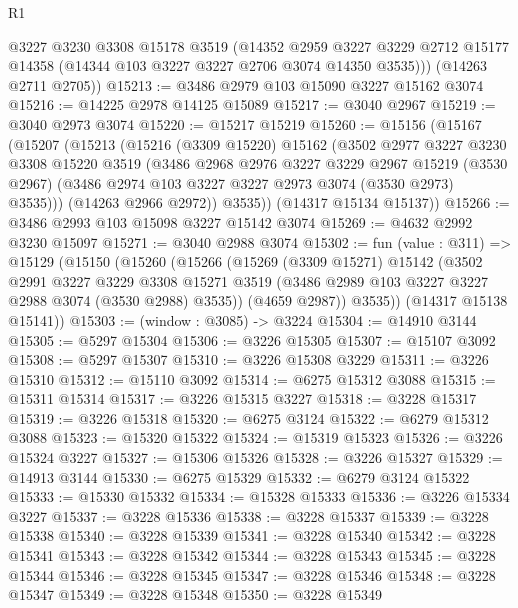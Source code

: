 \begin{lexlean}{R1}
\begin{coremodule}
        @3227
        @3230
        @3308
        @15178
        @3519
        (@14352
          @2959
          @3227
          @3229
          @2712
          @15177
          @14358
          (@14344 @103 @3227 @3227 @2706 @3074 @14350 @3535)))
      (@14263 @2711 @2705))
@15213 := @3486 @2979 @103 @15090 @3227 @15162 @3074
@15216 := @14225 @2978 @14125 @15089
@15217 := @3040 @2967
@15219 := @3040 @2973 @3074
@15220 := @15217 @15219
@15260 := @15156
    (@15167
      (@15207
        (@15213
          (@15216
            (@3309 @15220)
            @15162
            (@3502
              @2977
              @3227
              @3230
              @3308
              @15220
              @3519
              (@3486
                @2968
                @2976
                @3227
                @3229
                @2967
                @15219
                (@3530 @2967)
                (@3486 @2974 @103 @3227 @3227 @2973 @3074 (@3530 @2973) @3535)))
            (@14263 @2966 @2972))
          @3535))
      (@14317 @15134 @15137))
@15266 := @3486 @2993 @103 @15098 @3227 @15142 @3074
@15269 := @4632 @2992 @3230 @15097
@15271 := @3040 @2988 @3074
@15302 := fun (value : @311) =>
  @15129
    (@15150
      (@15260
        (@15266
          (@15269
            (@3309 @15271)
            @15142
            (@3502
              @2991
              @3227
              @3229
              @3308
              @15271
              @3519
              (@3486 @2989 @103 @3227 @3227 @2988 @3074 (@3530 @2988) @3535))
            (@4659 @2987))
          @3535))
      (@14317 @15138 @15141))
@15303 := (window : @3085) -> @3224
@15304 := @14910 @3144
@15305 := @5297 @15304
@15306 := @3226 @15305
@15307 := @15107 @3092
@15308 := @5297 @15307
@15310 := @3226 @15308 @3229
@15311 := @3226 @15310
@15312 := @15110 @3092
@15314 := @6275 @15312 @3088
@15315 := @15311 @15314
@15317 := @3226 @15315 @3227
@15318 := @3228 @15317
@15319 := @3226 @15318
@15320 := @6275 @3124
@15322 := @6279 @15312 @3088
@15323 := @15320 @15322
@15324 := @15319 @15323
@15326 := @3226 @15324 @3227
@15327 := @15306 @15326
@15328 := @3226 @15327
@15329 := @14913 @3144
@15330 := @6275 @15329
@15332 := @6279 @3124 @15322
@15333 := @15330 @15332
@15334 := @15328 @15333
@15336 := @3226 @15334 @3227
@15337 := @3228 @15336
@15338 := @3228 @15337
@15339 := @3228 @15338
@15340 := @3228 @15339
@15341 := @3228 @15340
@15342 := @3228 @15341
@15343 := @3228 @15342
@15344 := @3228 @15343
@15345 := @3228 @15344
@15346 := @3228 @15345
@15347 := @3228 @15346
@15348 := @3228 @15347
@15349 := @3228 @15348
@15350 := @3228 @15349

\end{coremodule}
\end{lexlean}
